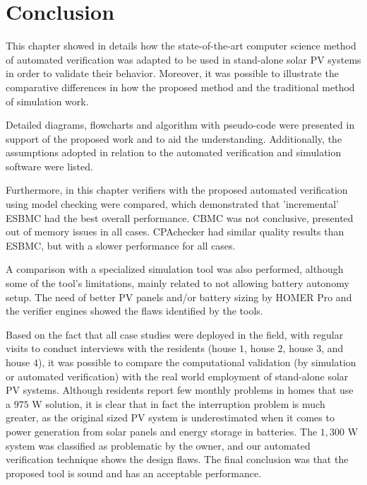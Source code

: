 \section{Conclusion}

This chapter showed in details how the state-of-the-art computer science method of automated verification was adapted to be used in stand-alone solar PV systems in order to validate their behavior. Moreover, it was possible to illustrate the comparative differences in how the proposed method and the traditional method of simulation work.

Detailed diagrams, flowcharts and algorithm with pseudo-code were presented in support of the proposed work and to aid the understanding. Additionally, the assumptions adopted in relation to the automated verification and simulation software were listed.

Furthermore, in this chapter verifiers with the proposed automated verification using model checking were compared, which demonstrated that 'incremental' ESBMC had the best overall performance. CBMC was not conclusive, presented out of memory issues in all cases. CPAchecker had similar quality results than ESBMC, but with a slower performance for all cases.

A comparison with a specialized simulation tool was also performed, although some of the tool's limitations, mainly related to not allowing battery autonomy setup.  The need of better PV panels and/or battery sizing by HOMER Pro and the verifier engines showed the flaws identified by the tools.

Based on the fact that all case studies were deployed in the field, with regular visits to conduct interviews with the residents (house $1$, house $2$, house $3$, and house $4$), it was possible to compare the computational validation (by simulation or automated verification) with the real world employment of stand-alone solar PV systems. Although residents report few monthly problems in homes that use a $975$ W solution, it is clear that in fact the interruption problem is much greater, as the original sized PV system is underestimated when it comes to power generation from solar panels and energy storage in batteries. The $1,300$ W system was classified as problematic by the owner, and our automated verification technique shows the design flaws. The final conclusion was that the proposed tool is sound and has an acceptable performance. 
